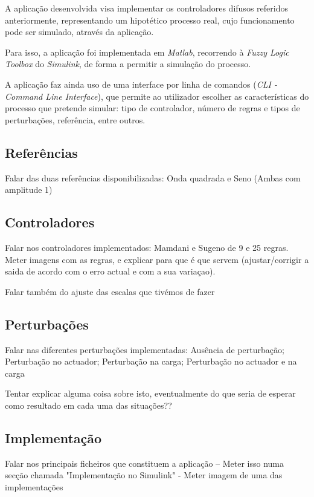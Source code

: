 \documentclass{article}
\begin{document}
A aplicação desenvolvida visa implementar os controladores difusos referidos anteriormente, representando um hipotético processo real, cujo funcionamento pode ser simulado, através da aplicação.

Para isso, a aplicação foi implementada em \emph{Matlab}, recorrendo à \emph{Fuzzy Logic Toolbox} do \emph{Simulink}, de forma a permitir a simulação do processo.

A aplicação faz ainda uso de uma interface por linha de comandos (\emph{CLI - Command Line Interface}), que permite ao utilizador escolher as características do processo que pretende simular: tipo de controlador, número de regras e tipos de perturbações, referência, entre outros.

\subsection{Referências}

Falar das duas referências disponibilizadas: Onda quadrada e Seno (Ambas com amplitude 1)

\subsection{Controladores}

Falar nos controladores implementados: Mamdani e Sugeno de 9 e 25 regras. Meter imagens com as regras, e explicar para que é que servem (ajustar/corrigir a saida de acordo com o erro actual e com a sua variaçao).

Falar também do ajuste das escalas que tivémos de fazer

\subsection{Perturbações}

Falar nas diferentes perturbações implementadas: Ausência de perturbação; Perturbação no actuador; Perturbação na carga; Perturbação no actuador e na carga

Tentar explicar alguma coisa sobre isto, eventualmente do que seria de esperar como resultado em cada uma das situações??

\subsection{Implementação}

Falar nos principais ficheiros que constituem a aplicação -- Meter isso numa secção chamada "Implementação no Simulink" - Meter imagem de uma das implementações
\end{document}
